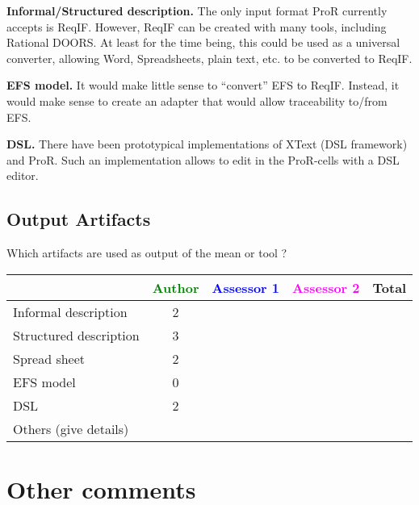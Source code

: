 \begin{author_comment}

\textbf{Informal/Structured description.} The only input format ProR currently accepts is ReqIF.  However, ReqIF can be created with many tools, including Rational DOORS.  At least for the time being, this could be used as a universal converter, allowing Word, Spreadsheets, plain text, etc. to be converted to ReqIF.

\textbf{EFS model.} It would make little sense to ``convert'' EFS to ReqIF.  Instead, it would make sense to create an adapter that would allow traceability to/from EFS.

\textbf{DSL.} There have been prototypical implementations of XText (DSL framework) and ProR.  Such an implementation allows to edit in the ProR-cells with a DSL editor.
\end{author_comment}



\subsection{Output Artifacts}

Which artifacts are used as output of the mean or tool  ? 


\begin{tabular}{|l | c | c | c | c|}
\hline
& \textcolor{green}{Author} & \textcolor{blue}{Assessor 1} & \textcolor{magenta}{Assessor 2} & Total \\
\hline 
Informal description & 2 & & &  \\
\hline
Structured description & 3 & & & \\
\hline
Spread sheet & 2 & & & \\
\hline
EFS model & 0 & & & \\
\hline
DSL & 2 & & & \\
\hline
Others (give details) & & & & \\
\hline
\end{tabular}


\begin{comment}
MPD : Todo
Ideas welcomed !

\end{comment}






\section{Other comments}



\begin{comment}
This section is available for the author or the assessors to  complete the description and criteria.
\end{comment}



